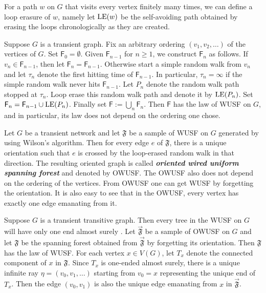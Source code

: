 \documentclass[12pt]{article}
\numberwithin{equation}{section}
\newcommand{\1}{\mathbf{1}}
\newcommand{\notion}[1]{{\bf  \textit{#1}}}
\begin{document}
 For a path $w$ on $G$ that visits every vertex finitely many times, we can define a loop erasure of $w$, namely let $\textnormal{LE}(w)$ be the self-avoiding path obtained by erasing the loops chronologically as they are created. 
 
 
 Suppose $G$ is a transient graph. Fix an arbitrary ordering $(v_1,v_2,\ldots)$ of the vertices of $G$. Set $\mathsf{F}_0=\emptyset$. Given $\mathsf{F}_{n-1}$ for $n\geq 1$, we construct $\mathsf{F}_n$ as follows. If $v_n\in \mathsf{F}_{n-1}$, then let $\mathsf{F}_n=\mathsf{F}_{n-1}$. Otherwise start a simple random walk from $v_n$ and  let $\tau_n$ denote the first hitting time of $\mathsf{F}_{n-1}$. In particular, $\tau_n=\infty$ if the simple random walk never hits $\mathsf{F}_{n-1}$. Let $P_n$ denote the random walk path stopped at $\tau_n$. Loop erase this random walk path and denote it by $\textnormal{LE}(P_n)$. Set $\mathsf{F}_n=\mathsf{F}_{n-1}\cup \textnormal{LE}(P_n)$.
 Finally set $\mathsf{F}:=\bigcup_{n}\mathsf{F}_n$. Then $\mathsf{F}$ has the law of WUSF on $G$, and in particular, its law does not depend on the ordering one chose. 
 
 
 
Let $G$ be a transient network and let $\mathfrak{F}$ be a sample of WUSF on $G$ generated by using Wilson's algorithm. Then for every edge $e$ of $\mathfrak{F}$, there is a unique orientation such that $e$ is crossed by the loop-erased random walk in that direction. The resulting oriented graph is called \notion{oriented wired uniform spanning forest} and denoted by OWUSF. The OWUSF also does not depend on the ordering of the vertices. From OWUSF one can get WUSF by forgetting the orientation. It is also easy to see that in the OWUSF, every vertex has exactly one edge emanating from it. 

 
 
 Suppose $G$ is a transient transitive graph. Then every tree in the WUSF on $G$ will have only one end almost surely \cite[Theorem 7.4]{LMS2008}. Let $\vec{\mathfrak{F}}$ be a sample of OWUSF on $G$ and let $\mathfrak{F}$ be the spanning forest obtained from $\vec{\mathfrak{F}}$ by forgetting its orientation. Then  $\mathfrak{F}$ has the law of WUSF. For each vertex $x\in V(G)$, let $T_x$ denote the connected component of $x$ in $\mathfrak{F}$. Since $T_x$ is one-ended almost surely, there is a unique infinite ray $\eta=(v_0,v_1,\ldots)$ starting from $v_0=x$ representing the unique end of $T_x$. Then the edge  $(v_0,v_1)$ is also the unique edge emanating from $x$ in $\vec{\mathfrak{F}}$. 
 
\end{document}

